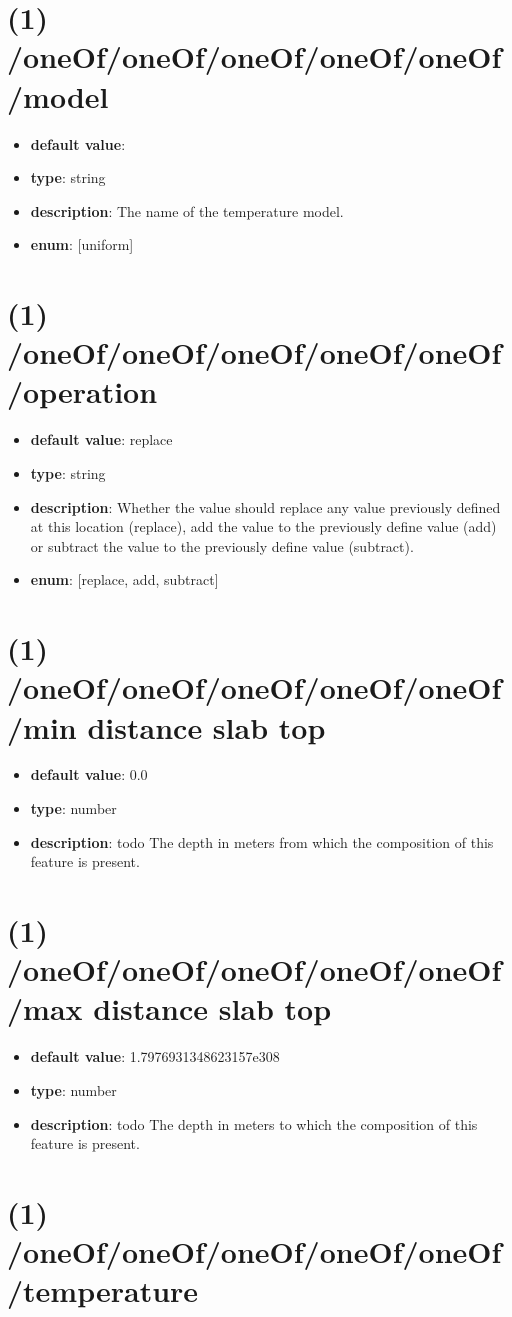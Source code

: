 \section{(1) /oneOf/oneOf/oneOf/oneOf/oneOf/model}
\begin{itemize}[leftmargin=1em]\item {\bf default value}: 
\item {\bf type}: string
\item {\bf description}: The name of the temperature model.
\item {\bf enum}: [uniform]\end{itemize}\section{(1) /oneOf/oneOf/oneOf/oneOf/oneOf/operation}
\begin{itemize}[leftmargin=1em]\item {\bf default value}: replace
\item {\bf type}: string
\item {\bf description}: Whether the value should replace any value previously defined at this location (replace), add the value to the previously define value (add) or subtract the value to the previously define value (subtract).
\item {\bf enum}: [replace, add, subtract]\end{itemize}\section{(1) /oneOf/oneOf/oneOf/oneOf/oneOf/min distance slab top}
\begin{itemize}[leftmargin=1em]\item {\bf default value}: 0.0
\item {\bf type}: number
\item {\bf description}: todo The depth in meters from which the composition of this feature is present.
\end{itemize}\section{(1) /oneOf/oneOf/oneOf/oneOf/oneOf/max distance slab top}
\begin{itemize}[leftmargin=1em]\item {\bf default value}: 1.7976931348623157e308
\item {\bf type}: number
\item {\bf description}: todo The depth in meters to which the composition of this feature is present.
\end{itemize}\section{(1) /oneOf/oneOf/oneOf/oneOf/oneOf/temperature}

